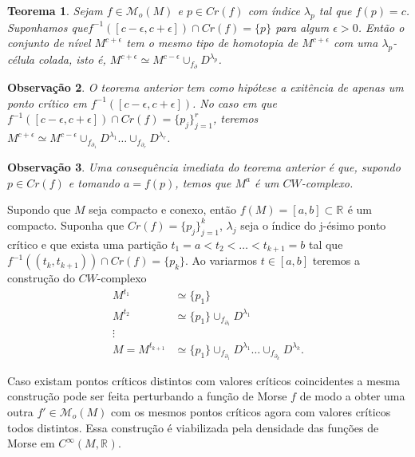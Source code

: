 \documentclass[12pt]{book}
\newtheorem{teorema}{Teorema}[section]
\newtheorem{observacao}[teorema]{Observação}
\newcommand{\funcoesmorse}[1]{\mathcal{M}_{o}(#1)}
\newcommand{\funcoessuaves}[1]{C^{\infty}(#1, \real{})}
\newcommand{\pontoscriticos}[1]{\textit{Cr}(#1)}
\newcommand{\real}[1]{\mathbb{R}^{#1}}
\newcommand{\reta}{\real{}}
\begin{document}
	\begin{teorema}\label{teorema cw_complexo_ponto_critico_morse}
		Sejam $f\in \funcoesmorse{M}$ e $p\in \pontoscriticos{f}$ com índice $\lambda_{p}$ tal que $f(p) = c$. Suponhamos que$f^{-1}([c-\epsilon,c+\epsilon])\cap \pontoscriticos{f} = \{p\}$ para algum $\epsilon>0$. Então o conjunto de nível $M^{c+\epsilon}$ tem o mesmo tipo de homotopia de $M^{c+\epsilon}$ com uma $\lambda_{p}$-célula colada, isto é, $M^{c+\epsilon} \simeq M^{c-\epsilon}\cup_{f_{\partial}} D^{\lambda_{p}}$.
	\end{teorema}
	
	\begin{observacao}
		O teorema anterior tem como hipótese a exitência de apenas um ponto crítico em $f^{-1}([c-\epsilon,c+\epsilon])$. No caso em que $f^{-1}([c-\epsilon,c+\epsilon]) \cap \pontoscriticos{f} = \{p_{j}\}_{j=1}^{r}$, teremos $M^{c+\epsilon} \simeq M^{c-\epsilon}\cup_{f_{\partial_{1}}} D^{\lambda_{1}}\dots  \cup_{f_{\partial_{r}}} D^{\lambda_{r}}$.
	\end{observacao}
	
	\begin{observacao}
		Uma consequência imediata do teorema anterior é que, supondo $p \in \pontoscriticos{f}$ e tomando $a = f(p)$, temos que $M^{a}$ é um $CW$-complexo. 
	\end{observacao}
	
	Supondo que $M$ seja compacto e conexo, então $f(M) = [a,b] \subset \reta$ é um compacto. Suponha que $\pontoscriticos{f} = \{p_{j}\}_{j=1}^{k}$, $\lambda_{j}$ seja o índice do j-ésimo ponto crítico e que exista uma partição $t_{1} = a < t_{2}< \dots< t_{k+1} = b$ tal que $f^{-1}((t_{k}, t_{k+1})) \cap \pontoscriticos{f} = \{p_{k}\}$. Ao variarmos $t \in [a,b]$ teremos a construção do $CW$-complexo
	$$
	\begin{aligned}
	M^{t_{1}} &\simeq \{p_{1}\}
	\\
	M^{t_{2}} & \simeq \{p_{1}\} \cup_{f_{\partial_{1}}} D^{\lambda_{1}}
	\\
	\vdots&
	\\
	M = M^{t_{k+1}} &\simeq\{p_{1}\} \cup_{f_{\partial_{1}}} D^{\lambda_{1}}\dots  \cup_{f_{\partial_{k}}} D^{\lambda_{k}}.
	\end{aligned}
	$$
	
	Caso existam pontos críticos distintos com valores críticos coincidentes a mesma construção pode ser feita perturbando a função de Morse $f$ de modo a obter uma outra $f' \in \funcoesmorse{M}$ com os mesmos pontos críticos agora com valores críticos todos distintos. Essa construção é viabilizada pela densidade das funções de Morse em $\funcoessuaves{M}$.
	
\end{document}
